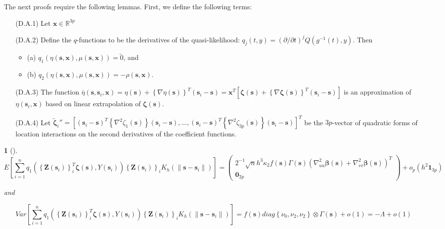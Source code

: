 \documentclass[english]{article}\usepackage[]{graphicx}\usepackage[]{color}
\theoremstyle{plain}
\theoremstyle{plain}
\newtheorem{lem}{\protect\lemmaname}
\providecommand{\lemmaname}{Lemma}
\begin{document}
The next proofs require the following lemmas. First, we define the
following terms:
\begin{itemize}
\item[(D.A.1)] Let $\bm{x}\in\mathbb{R}^{3p}$
\item[(D.A.2)] Define the $q$-functions to be the derivatives of the quasi-likelihood:
$q_{j}(t,y)=\left(\partial/\partial t\right)^{j}Q\left(g^{-1}\left(t\right),y\right)$.
Then

\begin{itemize}
\item (a) $q_{1}\left(\eta\left(\bm{s},\bm{x}\right),\mu\left(\bm{s},\bm{x}\right)\right)=\utilde{0}$,
and 
\item (b) $q_{2}\left(\eta\left(\bm{s},\bm{x}\right),\mu\left(\bm{s},\bm{x}\right)\right)=-\rho\left(\bm{s},\bm{x}\right)$.
\end{itemize}
\item[(D.A.3)] The function $\bar{\eta}\left(\bm{s},\bm{s}_{i},\bm{x}\right)=\eta\left(\bm{s}\right)+\left\{ \nabla\eta\left(\bm{s}\right)\right\} ^{T}\left(\bm{s}_{i}-\bm{s}\right)=\bm{x}^{T}\left[\bm{\zeta}\left(\bm{s}\right)+\left\{ \nabla\bm{\zeta}\left(\bm{s}\right)\right\} ^{T}\left(\bm{s}_{i}-\bm{s}\right)\right]$
is an approximation of $\eta\left(\bm{s}_{i},\bm{x}\right)$ based
on linear extrapolation of $\bm{\zeta}\left(\bm{s}\right)$.
\item[(D.A.4)] Let $\tilde{\bm{\zeta}}_{i}''=\left[\left(\bm{s}_{i}-\bm{s}\right)^{T}\left\{ \nabla^{2}\zeta_{1}\left(\bm{s}\right)\right\} \left(\bm{s}_{i}-\bm{s}\right),\dots,\left(\bm{s}_{i}-\bm{s}\right)^{T}\left\{ \nabla^{2}\zeta_{3p}\left(\bm{s}\right)\right\} \left(\bm{s}_{i}-\bm{s}\right)\right]^{T}$
be the $3p$-vector of quadratic forms of location interactions on
the second derivatives of the coefficient functions.\end{itemize}
\begin{lem}[\label{lemma:omega}]
\[
E\left[\sum_{i=1}^{n}q_{1}\left(\left\{ \bm{Z}\left(\bm{s}_{i}\right)\right\} _{i}^{T}\bm{\zeta}\left(\bm{s}\right),Y\left(\bm{s}_{i}\right)\right)\left\{ \bm{Z}\left(\bm{s}_{i}\right)\right\} _{i}K_{h}\left(\|\bm{s}-\bm{s}_{i}\|\right)\right]=\left(\begin{array}{c}
2^{-1}\sqrt{n}h^{3}\kappa_{2}f\left(\bm{s}\right)\Gamma\left(\bm{s}\right)\left(\nabla_{uu}^{2}\bm{\beta}\left(\bm{s}\right)+\nabla_{vv}^{2}\bm{\beta}\left(\bm{s}\right)\right)^{T}\\
\bm{0}_{2p}
\end{array}\right)+o_{p}\left(h^{2}\bm{1}_{3p}\right)
\]


and 

\[
Var\left[\sum_{i=1}^{n}q_{1}\left(\left\{ \bm{Z}\left(\bm{s}_{i}\right)\right\} _{i}^{T}\bm{\zeta}\left(\bm{s}\right),Y\left(\bm{s}_{i}\right)\right)\left\{ \bm{Z}\left(\bm{s}_{i}\right)\right\} _{i}K_{h}\left(\|\bm{s}-\bm{s}_{i}\|\right)\right]=f\left(\bm{s}\right)diag\left\{ \nu_{0},\nu_{2},\nu_{2}\right\} \otimes\Gamma\left(\bm{s}\right)+o\left(1\right)=-\Lambda+o\left(1\right)
\]

\end{lem}
\end{document}
